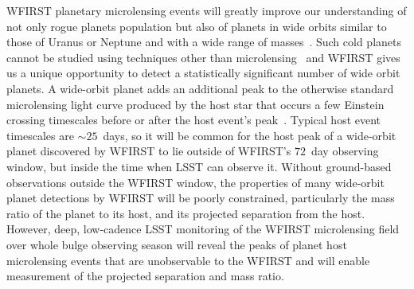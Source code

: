 WFIRST planetary microlensing events will greatly improve our
understanding of not only rogue planets population but also of planets in wide orbits similar to those of 
Uranus or Neptune and with a wide range of masses~\citep{2015arXiv150303757S}. Such cold planets
cannot be studied using techniques other than microlensing~\citep[e.g.,][]{2012ARAA..50..411G} and
WFIRST gives us a unique opportunity to detect a statistically significant
number of wide orbit planets.
A wide-orbit planet adds an additional peak to the otherwise
standard microlensing light curve produced by the host star that occurs a few Einstein crossing timescales before or after the host event's peak~\citep[e.g.,][]{2014ApJ...795...42P}. Typical host event timescales are ${\sim}25$~days, so it will be common for the host peak of a wide-orbit planet discovered by WFIRST to lie outside of WFIRST's $72$~day observing window, but inside the time when LSST can observe it. Without ground-based observations outside the WFIRST window, the properties of many wide-orbit planet detections by WFIRST will be poorly constrained, particularly the mass ratio of the planet to its host, and its projected separation from the host. However, deep, low-cadence LSST
monitoring of the WFIRST microlensing field over whole bulge observing season
will reveal the peaks of planet host microlensing events that are unobservable
to the WFIRST and will enable measurement of the projected separation and mass ratio.




